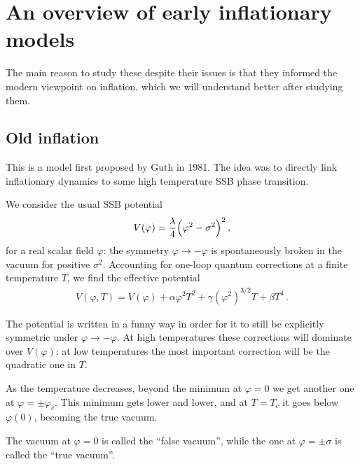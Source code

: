\documentclass[main.tex]{subfiles}
\begin{document}
\section{An overview of early inflationary models}


The main reason to study these despite their issues is that they informed the modern viewpoint on inflation, which we will understand better after studying them.

\subsection{Old inflation}

This is a model first proposed by Guth in 1981.
The idea was to directly link inflationary dynamics to some high temperature SSB phase transition. 

We consider the usual SSB potential  
%
\begin{align}
V(\varphi ) = \frac{\lambda}{4} \qty(\varphi^2 - \sigma^2)^2
\,,
\end{align}
%
for a real scalar field \(\varphi \): the symmetry \(\varphi \to -\varphi \) is spontaneously broken in the vacuum for positive \(\sigma^2\). 
Accounting for one-loop quantum corrections at a finite temperature \(T\), we find the effective potential 
%
\begin{align}
V(\varphi , T) = V(\varphi ) 
+ \alpha  \varphi^2 T^2
+ \gamma (\varphi^2)^{3/2} T
+ \beta T^{4} 
\,.
\end{align}

The potential is written in a funny way in order for it to still be explicitly symmetric under \(\varphi \to - \varphi \).  
At high temperatures these corrections will dominate over \(V(\varphi )\); at low temperatures the most important correction will be the quadratic one in \(T\). 

As the temperature decreases, beyond the minimum at \(\varphi = 0\) we get another one at \(\varphi = \pm \varphi_c\). 
This minimum gets lower and lower, and at \(T = T_c\) it goes below \(\varphi (0)\), becoming the true vacuum. 


The vacuum at \(\varphi = 0\) is called the ``false vacuum'', while the one at \(\varphi = \pm \sigma \) is called the ``true vacuum''.
\end{document}
